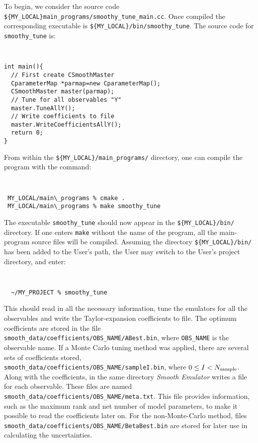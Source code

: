 \documentclass[UserManual.tex]{subfiles}
\begin{document}
To begin, we consider the source code {\tt \$\{MY\_LOCAL\}main\_programs/smoothy\_tune\_main.cc}. Once compiled the corresponding executable is {\tt \$\{MY\_LOCAL\}/bin/smoothy\_tune}. The source code for {\tt smoothy\_tune} is:
{\tt
\begin{verbatim}
int main(){
  // First create CSmoothMaster
  CparameterMap *parmap=new CparameterMap();
  CSmoothMaster master(parmap);  
  // Tune for all observables "Y"
  master.TuneAllY();
  // Write coefficients to file
  master.WriteCoefficientsAllY();
  return 0;
}
\end{verbatim}
}
From within the {\tt \$\{MY\_LOCAL\}/main\_programs/} directory, one can compile the program with the command:
{\tt
\begin{verbatim}
 MY_LOCAL/main\_programs % cmake .
 MY_LOCAL/main\_programs % make smoothy_tune
\end{verbatim}
}
The executable {\tt smoothy\_tune} should now appear in the {\tt \$\{MY\_LOCAL\}/bin/} directory. If one enters {\tt make} without the name of the program, all the main-program source files will be compiled. Assuming the directory {\tt \$\{MY\_LOCAL\}/bin/} has been added to the User's path, the User may switch to the User's project directory, and enter:
{\tt
\begin{verbatim}
  ~/MY_PROJECT % smoothy_tune
\end{verbatim}
}
This should read in all the necessary information, tune the emulators for all the observables and write the Taylor-expansion coefficients to file.  The optimum coefficients are stored in the file {\tt smooth\_data/coefficients/OBS\_NAME/ABest.bin}, where {\tt OBS\_NAME} is the observable name. If a Monte Carlo tuning method was applied, there are several sets of coefficients stored,\\{\tt smooth\_data/coefficients/OBS\_NAME/sampleI.bin}, where $0\le I<N_{\rm sample}$. Along with the coefficients, in the same directory {\it Smooth Emulator} writes a file for each observable. These files are named {\tt smooth\_data/coefficients/OBS\_NAME/meta.txt}.  This file provides information, such as the maximum rank and net number of model parameters, to make it possible to read the coefficients later on. For the non-Monte-Carlo method,  files {\tt smooth\_data/coefficients/OBS\_NAME/BetaBest.bin} are stored for later use in calculating the uncertainties.
\end{document}
